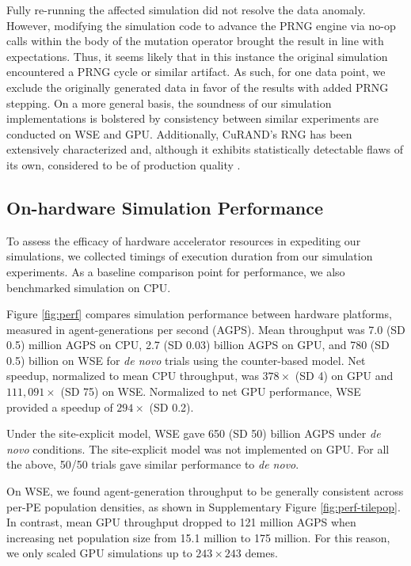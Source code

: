Fully re-running the affected simulation did not resolve the data anomaly.
However, modifying the simulation code to advance the PRNG engine via no-op calls within the body of the mutation operator brought the result in line with expectations.
Thus, it seems likely that in this instance the original simulation encountered a PRNG cycle or similar artifact.
As such, for one data point, we exclude the originally generated data in favor of the results with added PRNG stepping.
On a more general basis, the soundness of our simulation implementations is bolstered by consistency between similar experiments are conducted on WSE and GPU.
Additionally, CuRAND's RNG has been extensively characterized and, although it exhibits statistically detectable flaws of its own, considered to be of production quality \citep{nvidia2024curand}.

\subsection{On-hardware Simulation Performance}
\label{sec:performance}



To assess the efficacy of hardware accelerator resources in expediting our simulations, we collected timings of execution duration from our simulation experiments.
As a baseline comparison point for performance, we also benchmarked simulation on CPU.

Figure \ref{fig:perf} compares simulation performance between hardware platforms, measured in agent-generations per second (AGPS).
Mean throughput was 7.0 (SD 0.5) million AGPS on CPU, 2.7 (SD 0.03) billion AGPS on GPU, and 780 (SD 0.5) billion on WSE for \textit{de novo} trials using the counter-based model.
Net speedup, normalized to mean CPU throughput, was $378\times$ (SD 4) on GPU and $111,091\times$ (SD 75) on WSE.
Normalized to net GPU performance, WSE provided a speedup of $294\times$ (SD 0.2).

Under the site-explicit model, WSE gave 650 (SD 50) billion AGPS under \textit{de novo} conditions.
The site-explicit model was not implemented on GPU.
For all the above, 50/50 trials gave similar performance to \textit{de novo}.

On WSE, we found agent-generation throughput to be generally consistent across per-PE population densities, as shown in Supplementary Figure \ref{fig:perf-tilepop}.
In contrast, mean GPU throughput dropped to 121 million AGPS when increasing net population size from 15.1 million to 175 million.
For this reason, we only scaled GPU simulations up to $243 \times 243$ demes.


